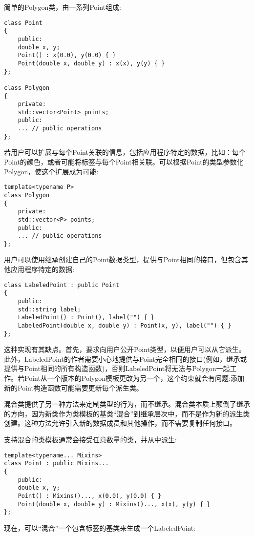 
简单的Polygon类，由一系列Point组成:

\begin{lstlisting}[style=styleCXX]
class Point
{
	public:
	double x, y;
	Point() : x(0.0), y(0.0) { }
	Point(double x, double y) : x(x), y(y) { }
};

class Polygon
{
	private:
	std::vector<Point> points;
	public:
	... // public operations
};
\end{lstlisting}

若用户可以扩展与每个Point关联的信息，包括应用程序特定的数据，比如：每个Point的颜色，或者可能将标签与每个Point相关联。可以根据Point的类型参数化Polygon，使这个扩展成为可能:

\begin{lstlisting}[style=styleCXX]
template<typename P>
class Polygon
{
	private:
	std::vector<P> points;
	public:
	... // public operations
};
\end{lstlisting}

用户可以使用继承创建自己的Point数据类型，提供与Point相同的接口，但包含其他应用程序特定的数据:

\begin{lstlisting}[style=styleCXX]
class LabeledPoint : public Point
{
	public:
	std::string label;
	LabeledPoint() : Point(), label("") { }
	LabeledPoint(double x, double y) : Point(x, y), label("") { }
};
\end{lstlisting}

这种实现有其缺点。首先，要求向用户公开Point类型，以便用户可以从它派生。此外，LabeledPoint的作者需要小心地提供与Point完全相同的接口(例如，继承或提供与Point相同的所有构造函数)，否则LabeledPoint将无法与Polygon一起工作。若Point从一个版本的Polygon模板更改为另一个，这个约束就会有问题:添加新的Point构造函数可能需要更新每个派生类。

混合类提供了另一种方法来定制类型的行为，而不继承。混合类本质上颠倒了继承的方向，因为新类作为类模板的基类“混合”到继承层次中，而不是作为新的派生类创建。这种方法允许引入新的数据成员和其他操作，而不需要复制任何接口。

支持混合的类模板通常会接受任意数量的类，并从中派生:

\begin{lstlisting}[style=styleCXX]
template<typename... Mixins>
class Point : public Mixins...
{
	public:
	double x, y;
	Point() : Mixins()..., x(0.0), y(0.0) { }
	Point(double x, double y) : Mixins()..., x(x), y(y) { }
};
\end{lstlisting}

现在，可以“混合”一个包含标签的基类来生成一个LabeledPoint:

